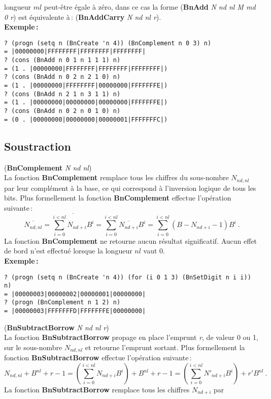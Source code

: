 longueur $ml$ peut-\^etre \'egale \`a z\'ero, dans ce cas la forme
({\bf BnAdd} {\em N nd nl M md 0 r}) est \'equivalente \`a\,:
({\bf BnAddCarry} {\em N nd nl r}).
\\[18pt]
{\bf Exemple\,:}
\begin{verbatim}
? (progn (setq n (BnCreate 'n 4)) (BnComplement n 0 3) n)
= |00000000|FFFFFFFF|FFFFFFFF|FFFFFFFF|
? (cons (BnAdd n 0 1 n 1 1 1) n)
= (1 . |00000000|FFFFFFFF|FFFFFFFF|FFFFFFFF|)
? (cons (BnAdd n 0 2 n 2 1 0) n)
= (1 . |00000000|FFFFFFFF|00000000|FFFFFFFE|)
? (cons (BnAdd n 2 1 n 3 1 1) n)
= (1 . |00000000|00000000|00000000|FFFFFFFE|)
? (cons (BnAdd n 0 2 n 0 1 0) n)
= (0 . |00000000|00000000|00000001|FFFFFFFC|)
\end{verbatim}
\vspace*{15pt}

\subsection{Soustraction}
({\bf BnComplement} {\em N nd nl})
\\[12pt]
La fonction {\bf BnComplement} remplace tous les chiffres du sous-nombre
$N_{nd,nl}$ par leur compl\'ement \`a la base, ce qui correspond \`a
l'inversion logique de tous les bits. Plus formellement la fonction
{\bf BnComplement} effectue l'op\'eration suivante\,:
\[ \overline{N_{nd,nl}} = \overline{\sum_{i=0}^{i<nl}N_{nd+i} B^i} = \sum_{i=0}^{i<nl}\overline{N_{nd+i}} B^i = \sum_{i=0}^{i<nl}(B - N_{nd+i} - 1) B^i\ .\]
La fonction {\bf BnComplement} ne retourne aucun r\'esultat significatif. Aucun
effet de bord n'est effectu\'e lorsque la longueur $nl$ vaut 0.
\\[18pt]
{\bf Exemple\,:}
\begin{verbatim}
? (progn (setq n (BnCreate 'n 4)) (for (i 0 1 3) (BnSetDigit n i i)) n)
= |00000003|00000002|00000001|00000000|
? (progn (BnComplement n 1 2) n)
= |00000003|FFFFFFFD|FFFFFFFE|00000000|
\end{verbatim}
\vspace*{12pt}
({\bf BnSubtractBorrow} {\em N nd nl r})
\\[12pt]
La fonction {\bf BnSubtractBorrow} propage en place l'emprunt {\em r}, de
valeur 0 ou 1, sur le sous-nombre $N_{nd,nl}$ et retourne l'emprunt
sortant. Plus formellement la fonction {\bf BnSubtractBorrow} effectue
l'op\'eration suivante\,:
\[ N_{nd,nl} + B^{nl} + r - 1 = (\sum_{i=0}^{i<nl}N_{nd+i} B^i) + B^{nl} + r - 1 = (\sum_{i=0}^{i<nl}N'_{nd+i} B^i) + r' B^{nl}\ .\]
La fonction {\bf BnSubtractBorrow} remplace tous les chiffres $N_{nd+i}$ par

